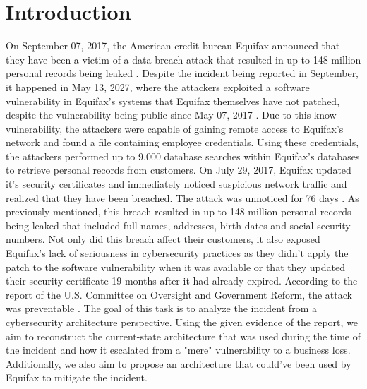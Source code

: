 \chapter{Introduction}

On September 07, 2017, the American credit bureau Equifax announced that they have been a victim of a data breach attack that resulted in up to 148 million personal records being leaked \cite{report}.
\newline
Despite the incident being reported in September, it happened in May 13, 2027, where the attackers exploited a software vulnerability in Equifax's systems that Equifax themselves have not patched, despite the vulnerability being public since May 07, 2017 \cite{arstechnicabug}. 
\newline
Due to this know vulnerability, the attackers were capable of gaining remote access to Equifax's network and found a file containing employee credentials. Using these credentials, the attackers performed up to 9.000 database searches within Equifax's databases to retrieve personal records from customers. On July 29, 2017, Equifax updated it's security certificates and immediately noticed suspicious network traffic and realized that they have been breached. The attack was unnoticed for 76 days \cite{report}.
\newline
As previously mentioned, this breach resulted in up to 148 million personal records being leaked that included full names, addresses, birth dates and social security numbers. Not only did this breach affect their customers, it also exposed Equifax's lack of seriousness in cybersecurity practices as they didn't apply the patch to the software vulnerability when it was available or that they updated their security certificate 19 months after it had already expired. According to the report of the U.S. Committee on Oversight and Government Reform, the attack was preventable \cite{report}.
\newline
The goal of this task is to analyze the incident from a cybersecurity architecture perspective. Using the given evidence of the report, we aim to reconstruct the current-state architecture that was used during the time of the incident and how it escalated from a "mere" vulnerability to a business loss. Additionally, we also aim to propose an architecture that could've been used by Equifax to mitigate the incident. 
